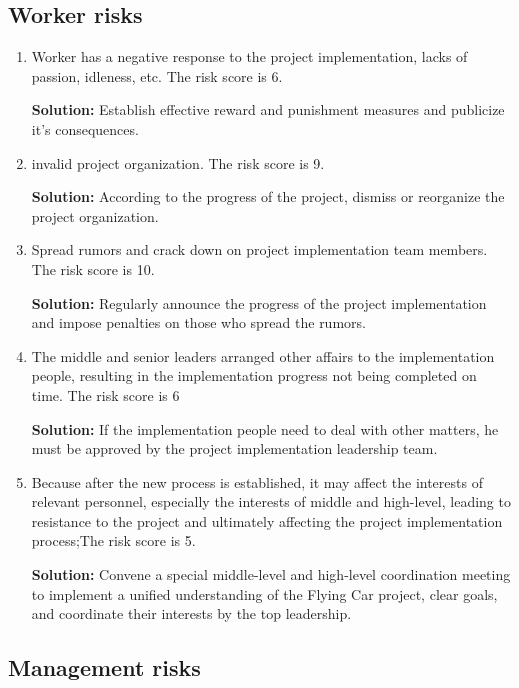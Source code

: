 \subsection{Worker risks}

\begin{enumerate}
\item Worker has a negative response to the project implementation, lacks of passion, idleness, etc. The risk score is 6.

\textbf{Solution:} Establish effective reward and punishment measures and publicize it’s consequences.

\item invalid project organization. The risk score is 9.

\textbf{Solution:} According to the progress of the project, dismiss or reorganize the project organization.

\item Spread rumors and crack down on project implementation team members. The risk score is 10.

\textbf{Solution:} Regularly announce the progress of the project implementation and impose penalties on those who spread the rumors.

\item The middle and senior leaders arranged other affairs to the implementation people, resulting in the implementation progress not being completed on time. The risk score is 6

\textbf{Solution:} If the implementation people need to deal with other matters, he must be approved by the project implementation leadership team.

\item Because after the new process is established, it may affect the interests of relevant personnel, especially the interests of middle and high-level, leading to resistance to the project and ultimately affecting the project implementation process;The risk score is 5.

\textbf{Solution:} Convene a special middle-level and high-level coordination meeting to implement a unified understanding of the Flying Car project, clear goals, and coordinate their interests by the top leadership.
\end{enumerate}

\subsection{Management risks}


